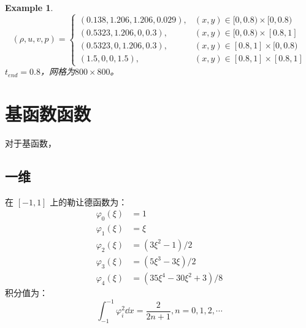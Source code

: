 \documentclass{article}
\newtheorem{example}{Example}
\numberwithin{equation}{subsection}    %
\begin{document}
\begin{appendix}
    \begin{example}
        \begin{equation}
            (\rho, u, v, p)=\begin{cases}
                (0.138,1.206,1.206,0.029), & (x, y) \in[0,0.8) \times[0,0.8) \\
                (0.5323,1.206,0,0.3),      & (x, y) \in[0,0.8) \times[0.8,1] \\
                (0.5323,0,1.206,0.3),      & (x, y) \in[0.8,1] \times[0,0.8) \\
                (1.5,0,0,1.5),             & (x, y) \in[0.8,1] \times[0.8,1]
            \end{cases}
        \end{equation}
        $t_{end}=0.8$，网格为$800\times800$。
    \end{example}
    \newpage
    \section{基函数函数}
    对于基函数，
    \cite{RN48}
    \subsection{一维}
    在 $[-1,1]$ 上的勒让德函数为：
    \begin{equation}
        \begin{aligned}
            \varphi_{0}(\xi) & =1                                        \\
            \varphi_{1}(\xi) & =\xi                                      \\
            \varphi_{2}(\xi) & =\left(3 \xi^{2}-1\right) / 2             \\
            \varphi_{3}(\xi) & =\left(5 \xi^{3}-3 \xi\right) / 2         \\
            \varphi_{4}(\xi) & =\left(35 \xi^{4}-30 \xi^{2}+3\right) / 8
        \end{aligned}
    \end{equation}
    积分值为：
    \begin{equation}
        \int_{-1}^{-1}\varphi_i^2\dd x=\frac{2}{2n+1},n=0,1,2,\cdots
    \end{equation}


\end{appendix}
\end{document}
